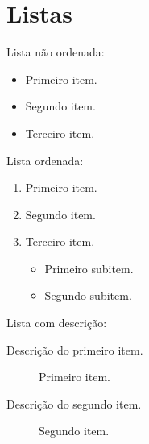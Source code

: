 \documentclass{article}
\begin{document}
\section{Listas}
Lista não ordenada:

\begin{itemize}
  \item Primeiro item.
  \item Segundo item.
  \item Terceiro item.
\end{itemize}

Lista ordenada:

\begin{enumerate}
  \item Primeiro item.
  \item Segundo item.
  \item Terceiro item.
    \begin{itemize}
      \item Primeiro subitem.
      \item Segundo subitem.
    \end{itemize}
\end{enumerate}

Lista com descrição:

\begin{description}
  \item[Descrição do primeiro item.] Primeiro item.
  \item[Descrição do segundo item.] Segundo item.
\end{description}
\end{document}
